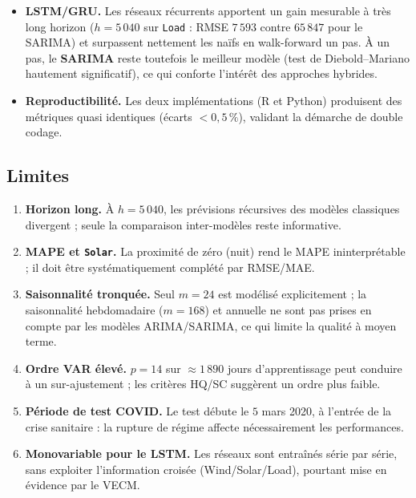 \begin{itemize}
  \item \textbf{LSTM/GRU.} Les réseaux récurrents apportent un gain mesurable
        à très long horizon (\(h=5\,040\) sur \texttt{Load} : RMSE \(7\,593\)
        contre \(65\,847\) pour le SARIMA) et surpassent nettement les naïfs
        en walk-forward un pas. À un pas, le \textbf{SARIMA} reste toutefois
        le meilleur modèle (test de Diebold--Mariano hautement significatif),
        ce qui conforte l'intérêt des approches hybrides.

  \item \textbf{Reproductibilité.} Les deux implémentations (R et Python)
        produisent des métriques quasi identiques (écarts \(<0{,}5\,\%\)),
        validant la démarche de double codage.
\end{itemize}

\subsection{Limites}
\begin{enumerate}
  \item \textbf{Horizon long.} À \(h=5\,040\), les prévisions récursives des
        modèles classiques divergent ; seule la comparaison
        inter-modèles reste informative.
  \item \textbf{MAPE et \texttt{Solar}.} La proximité de zéro (nuit) rend le
        MAPE ininterprétable ; il doit être systématiquement complété par
        RMSE/MAE.
  \item \textbf{Saisonnalité tronquée.} Seul \(m=24\) est modélisé
        explicitement ; la saisonnalité hebdomadaire (\(m=168\)) et annuelle
        ne sont pas prises en compte par les modèles ARIMA/SARIMA, ce qui
        limite la qualité à moyen terme.
  \item \textbf{Ordre VAR élevé.} \(p=14\) sur \(\approx 1\,890\) jours
        d'apprentissage peut conduire à un sur-ajustement ; les critères
        HQ/SC suggèrent un ordre plus faible.
  \item \textbf{Période de test COVID.} Le test débute le \(5\) mars 2020,
        à l'entrée de la crise sanitaire : la rupture de régime affecte
        nécessairement les performances.
  \item \textbf{Monovariable pour le LSTM.} Les réseaux sont entraînés série
        par série, sans exploiter l'information croisée (Wind/Solar/Load),
        pourtant mise en évidence par le VECM.
\end{enumerate}

